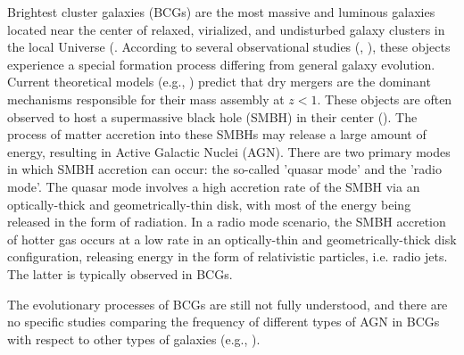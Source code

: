 \begin{comment}
These analyses reveal that based on a optical point of view BCGs show a greater AGN activity $\sim 60 \%$ when compared to the $\sim 16\%$ obtained on the other sample similar to the ones obtained by \cite{2012A&A...546A..17V}.
While At the same time Radio Loud inspections show that the fractions of AGN objects is similar between the BCG sample ($\sim 62 \%$) and the other ( $\sim 68\%$)

In conclusion, these results strongly support the idea that BCGs are more likely to exhibit radio loudness, as observed in previous studies such \cite{2016MNRAS.460.3669Y, 2014MNRAS.440..762O}. Therefore, any future investigations in this context should prioritize a radio analysis over an optical one.
\end{comment}


Brightest cluster galaxies (BCGs) are the most massive and luminous galaxies located near the center of relaxed, virialized, and undisturbed galaxy clusters in the local Universe (\cite{1976ApJ...205..688S, 2010MNRAS.404.1231V}.
According to several observational studies (\cite{2017MNRAS.467.4101G}, \cite{2020MNRAS.498.2719T}), these objects experience a special formation process differing from general galaxy evolution. Current theoretical models (e.g., \cite{2007MNRAS.375....2D, 2019ApJ...881..150C}) predict that dry mergers are the dominant mechanisms responsible for their mass assembly at $z<1$.
These objects are often observed to host a supermassive black hole (SMBH) in their center (\cite{2006ApJ...652..216R}). The process of matter accretion into these SMBHs may release a large amount of energy, resulting in Active Galactic Nuclei (AGN). There are two primary modes in which SMBH accretion can occur: the so-called 'quasar mode' and the 'radio mode'. The quasar mode involves a high accretion rate of the SMBH via an optically-thick and geometrically-thin disk, with most of the energy being released in the form of radiation. In a radio mode scenario, the SMBH accretion of hotter gas occurs at a low rate in an optically-thin and geometrically-thick disk configuration, releasing energy in the form of relativistic particles, i.e. radio jets. The latter is typically observed in BCGs.

The evolutionary processes of BCGs are still not fully understood, and there are no specific studies comparing the frequency of different types of AGN in BCGs with respect to other types of galaxies (e.g., \cite{2019CoBAO..66..153F}).

